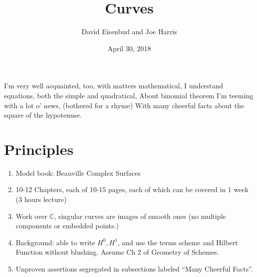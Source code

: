 \documentclass[12pt, leqno]{article}
\date{April 30, 2018}
\title{Curves}
\author{David Eisenbud and Joe Harris }
\def\CC{{\mathbb C}}
\begin{document}
\maketitle

I'm very well acquainted, too, with matters mathematical,
I understand equations, both the simple and quadratical,
About binomial theorem I'm teeming with a lot o' news, (bothered for a rhyme)
With many cheerful facts about the square of the hypotenuse.

\section*{Principles}
\begin{enumerate}

\item Model book: Beauville Complex Surfaces

\item 10-12 Chapters, each of 10-15 pages, each of which can be covered in 1 week (3 hours lecture)

\item Work over $\CC$, singular curves are images of smooth ones (no multiple components or embedded points.)

\item Background: able to write $H^0, H^1$, and use the terms scheme and Hilbert Function  without blushing. Assume Ch 2 of Geometry of Schemes.

\item Unproven assertions segregated in subsections labeled ``Many Cheerful Facts''.
\end{enumerate}
\end{document}

